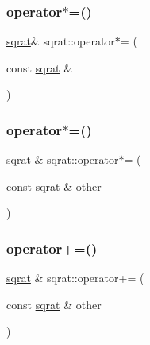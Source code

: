 \mbox{\label{classsqrat_aae14e57b87f37f2073e809efd51fbe8e}} 
\subsubsection{\texorpdfstring{operator$\ast$=()}{operator*=()}\hspace{0.1cm}{\footnotesize\ttfamily [1/2]}}
{\footnotesize\ttfamily \mbox{\hyperlink{classsqrat}{sqrat}}\& sqrat\+::operator$\ast$= (\begin{DoxyParamCaption}\item[{const \mbox{\hyperlink{classsqrat}{sqrat}} \&}]{ }\end{DoxyParamCaption})}

\mbox{\label{classsqrat_a6be4d90a04d40dcdbbb0021e63893718}} 
\subsubsection{\texorpdfstring{operator$\ast$=()}{operator*=()}\hspace{0.1cm}{\footnotesize\ttfamily [2/2]}}
{\footnotesize\ttfamily \mbox{\hyperlink{classsqrat}{sqrat}} \& sqrat\+::operator$\ast$= (\begin{DoxyParamCaption}\item[{const \mbox{\hyperlink{classsqrat}{sqrat}} \&}]{other }\end{DoxyParamCaption})}

\mbox{\label{classsqrat_a6b114d2daa3204ec91671ad701f177c0}} 
\subsubsection{\texorpdfstring{operator+=()}{operator+=()}\hspace{0.1cm}{\footnotesize\ttfamily [1/2]}}
{\footnotesize\ttfamily \mbox{\hyperlink{classsqrat}{sqrat}} \& sqrat\+::operator+= (\begin{DoxyParamCaption}\item[{const \mbox{\hyperlink{classsqrat}{sqrat}} \&}]{other }\end{DoxyParamCaption})}

